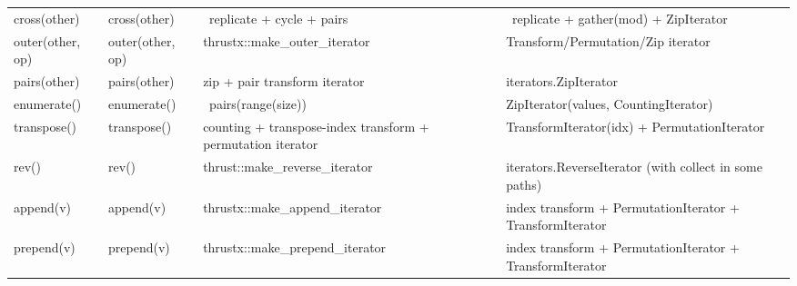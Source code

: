 \documentclass[10pt]{article}
\newcommand{\parrotemoji}{{\emojifont\normalsize\symbol{"1F99C}}}
\newcommand{\parrotimpl}{\parrotemoji}
\begin{document}
\begin{minipage}{\textwidth}
\begin{tabularx}{\textwidth}{ll>{\raggedright\arraybackslash}X>{\raggedright\arraybackslash}X}
cross(other) & cross(other) & \parrotimpl\ replicate + cycle + pairs & \parrotimpl\ replicate + gather(mod) + ZipIterator \\
outer(other, op) & outer(other, op) & thrustx::make\_outer\_iterator & Transform/Permutation/Zip iterator \\
pairs(other) & pairs(other) & zip + pair transform iterator & iterators.ZipIterator \\
enumerate() & enumerate() & \parrotimpl\ pairs(range(size)) & ZipIterator(values, CountingIterator) \\
transpose() & transpose() & counting + transpose-index transform + permutation iterator & TransformIterator(idx) + PermutationIterator \\
rev() & rev() & thrust::make\_reverse\_iterator & iterators.ReverseIterator (with collect in some paths) \\
append(v) & append(v) & thrustx::make\_append\_iterator & index transform + PermutationIterator + TransformIterator \\
prepend(v) & prepend(v) & thrustx::make\_prepend\_iterator & index transform + PermutationIterator + TransformIterator \\
\bottomrule
\end{tabularx}
\end{minipage}
\end{document}
